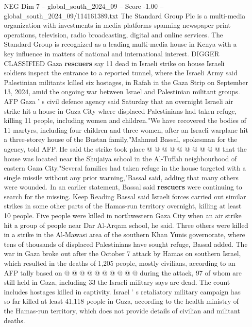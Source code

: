 \begin{textsample}{NEG Dim 7 – global\_south\_2024\_09 – Score -1.00 – global\_south\_2024\_09/114161389.txt}  \label{ex:f7_neg_223}
The Standard Group Plc is a multi-media organization with investments in media platforms spanning newspaper print operations, television, radio broadcasting, digital and online services.
The Standard Group is recognized as a leading multi-media house in Kenya with a key influence in matters of national and international interest.
DIGGER CLASSIFIED Gaza \textbf{rescuers} say 11 dead in Israeli strike on house Israeli soldiers inspect the entrance to a reported tunnel, where the Israeli Army said Palestinian militants killed six hostages, in Rafah in the Gaza Strip on September 13, 2024, amid the ongoing war between Israel and Palestinian militant groups.
AFP Gaza ' s civil defence agency said Saturday that an overnight Israeli air strike hit a house in Gaza City where displaced Palestinians had taken refuge, killing 11 people, including women and children."We have recovered the bodies of 11 martyrs, including four children and three women, after an Israeli warplane hit a three-storey house of the Bustan family,"Mahmud Bassal, spokesman for the agency, told AFP.
He said the strike took place @ @ @ @ @ @ @ @ @ @ that the house was located near the Shujaiya school in the Al-Tuffah neighbourhood of eastern Gaza City."Several families had taken refuge in the house targeted with a single missile without any prior warning,"Bassal said, adding that many others were wounded.
In an earlier statement, Bassal said \textbf{rescuers} were continuing to search for the missing.
Keep Reading Bassal said Israeli forces carried out similar strikes in some other parts of the Hamas-run territory overnight, killing at least 10 people.
Five people were killed in northwestern Gaza City when an air strike hit a group of people near Dar Al-Arqam school, he said.
Three others were killed in a strike in the Al-Mawasi area of the southern Khan Yunis governorate, where tens of thousands of displaced Palestinians have sought refuge, Bassal added.
The war in Gaza broke out after the October 7 attack by Hamas on southern Israel, which resulted in the deaths of 1,205 people, mostly civilians, according to an AFP tally based on @ @ @ @ @ @ @ @ @ @ during the attack, 97 of whom are still held in Gaza, including 33 the Israeli military says are dead.
The count includes hostages killed in captivity.
Israel ' s retaliatory military campaign has so far killed at least 41,118 people in Gaza, according to the health ministry of the Hamas-run territory, which does not provide details of civilian and militant deaths.

\end{textsample}
